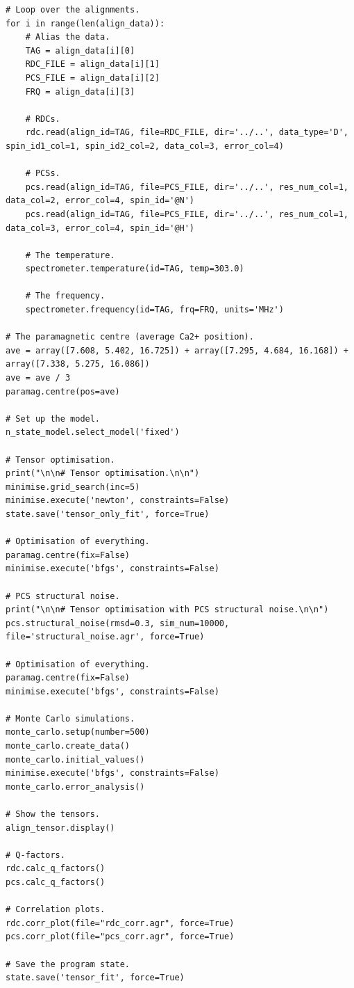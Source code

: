 \begin{lstlisting}
# Loop over the alignments.
for i in range(len(align_data)):
    # Alias the data.
    TAG = align_data[i][0]
    RDC_FILE = align_data[i][1]
    PCS_FILE = align_data[i][2]
    FRQ = align_data[i][3]

    # RDCs.
    rdc.read(align_id=TAG, file=RDC_FILE, dir='../..', data_type='D', spin_id1_col=1, spin_id2_col=2, data_col=3, error_col=4)

    # PCSs.
    pcs.read(align_id=TAG, file=PCS_FILE, dir='../..', res_num_col=1, data_col=2, error_col=4, spin_id='@N')
    pcs.read(align_id=TAG, file=PCS_FILE, dir='../..', res_num_col=1, data_col=3, error_col=4, spin_id='@H')

    # The temperature.
    spectrometer.temperature(id=TAG, temp=303.0)

    # The frequency.
    spectrometer.frequency(id=TAG, frq=FRQ, units='MHz')

# The paramagnetic centre (average Ca2+ position).
ave = array([7.608, 5.402, 16.725]) + array([7.295, 4.684, 16.168]) + array([7.338, 5.275, 16.086])
ave = ave / 3
paramag.centre(pos=ave)

# Set up the model.
n_state_model.select_model('fixed')

# Tensor optimisation.
print("\n\n# Tensor optimisation.\n\n")
minimise.grid_search(inc=5)
minimise.execute('newton', constraints=False)
state.save('tensor_only_fit', force=True)

# Optimisation of everything.
paramag.centre(fix=False)
minimise.execute('bfgs', constraints=False)

# PCS structural noise.
print("\n\n# Tensor optimisation with PCS structural noise.\n\n")
pcs.structural_noise(rmsd=0.3, sim_num=10000, file='structural_noise.agr', force=True)

# Optimisation of everything.
paramag.centre(fix=False)
minimise.execute('bfgs', constraints=False)

# Monte Carlo simulations.
monte_carlo.setup(number=500)
monte_carlo.create_data()
monte_carlo.initial_values()
minimise.execute('bfgs', constraints=False)
monte_carlo.error_analysis()

# Show the tensors.
align_tensor.display()

# Q-factors.
rdc.calc_q_factors()
pcs.calc_q_factors()

# Correlation plots.
rdc.corr_plot(file="rdc_corr.agr", force=True)
pcs.corr_plot(file="pcs_corr.agr", force=True)

# Save the program state.
state.save('tensor_fit', force=True)
\end{lstlisting}

